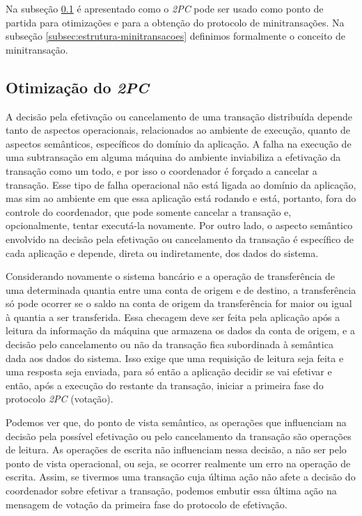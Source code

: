 \documentclass[11pt,twoside,a4paper]{book}
\begin{document}
Na subseção \ref{subsec:derivando-minitransacoes} é apresentado como o \emph{2PC} pode ser usado como ponto de partida para otimizações e para a obtenção do protocolo de minitransações. Na subseção \ref{subsec:estrutura-minitransacoes} definimos formalmente o conceito de minitransação.

\subsection{Otimização do \emph{2PC}}
\label{subsec:derivando-minitransacoes}
A decisão pela efetivação ou cancelamento de uma transação distribuída depende tanto de aspectos operacionais, relacionados ao ambiente de execução, quanto de aspectos semânticos, específicos do domínio da aplicação. A falha na execução de uma subtransação em alguma máquina do ambiente inviabiliza a efetivação da transação como um todo, e por isso o coordenador é forçado a cancelar a transação. Esse tipo de falha operacional não está ligada ao domínio da aplicação, mas sim ao ambiente em que essa aplicação está rodando e está, portanto, fora do controle do coordenador, que pode somente cancelar a transação e, opcionalmente, tentar executá-la novamente. Por outro lado, o aspecto semântico envolvido na decisão pela efetivação ou cancelamento da transação é específico de cada aplicação e depende, direta ou indiretamente, dos dados do sistema.

Considerando novamente o sistema bancário e a operação de transferência de uma determinada quantia entre uma conta de origem e de destino, a transferência só pode ocorrer se o saldo na conta de origem da transferência for maior ou igual à quantia a ser transferida. Essa checagem deve ser feita pela aplicação após a leitura da informação da máquina que armazena os dados da conta de origem, e a decisão pelo cancelamento ou não da transação fica subordinada à semântica dada aos dados do sistema. Isso exige que uma requisição de leitura seja feita e uma resposta seja enviada, para só então a aplicação decidir se vai efetivar e então, após a execução do restante da transação, iniciar a primeira fase do protocolo \emph{2PC} (votação).

Podemos ver que, do ponto de vista semântico, as operações que influenciam na decisão pela possível efetivação ou pelo cancelamento da transação são operações de leitura. As operações de escrita não influenciam nessa decisão, a não ser pelo ponto de vista operacional, ou seja, se ocorrer realmente um erro na operação de escrita. Assim, se tivermos uma transação cuja última ação não afete a decisão do coordenador sobre efetivar a transação, podemos embutir essa última ação na mensagem de votação da primeira fase do protocolo de efetivação.
\end{document}
